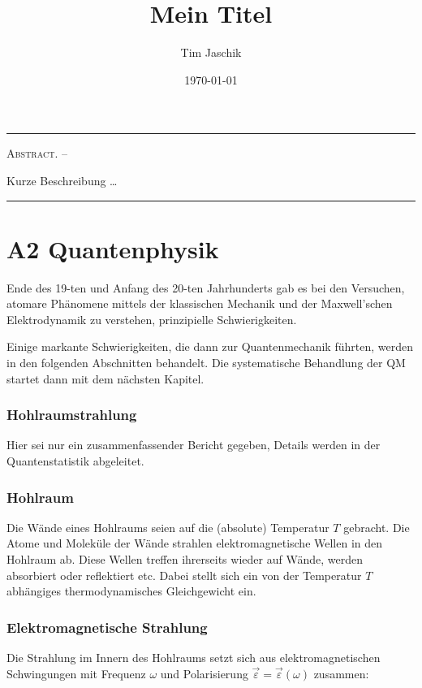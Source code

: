 \documentclass[10pt, letterpaper]{article}
\title{Mein Titel}
\author{Tim Jaschik}
\date{\today}
\renewenvironment{abstract}
  {
    \begin{adjustwidth}{1.5cm}{1.5cm}
    \small
    \textsc{Abstract. –}%
  }
  {
    \end{adjustwidth}
  }
\begin{document}
\maketitle
\rule{\textwidth}{0.5pt}
\begin{abstract}
Kurze Beschreibung …
\end{abstract}
\rule{\textwidth}{0.5pt}
\vspace{0.5cm}

\tableofcontents

\pagebreak



\section{A2 Quantenphysik}
Ende des 19-ten und Anfang des 20-ten Jahrhunderts gab es bei den Versuchen, atomare Phänomene mittels der klassischen Mechanik und der Maxwell'schen Elektrodynamik zu verstehen, prinzipielle Schwierigkeiten.

Einige markante Schwierigkeiten, die dann zur Quantenmechanik führten, werden in den folgenden Abschnitten behandelt. Die systematische Behandlung der QM startet dann mit dem nächsten Kapitel.

\subsubsection*{Hohlraumstrahlung}
Hier sei nur ein zusammenfassender Bericht gegeben, Details werden in der Quantenstatistik abgeleitet.

\subsubsection*{Hohlraum}
Die Wände eines Hohlraums seien auf die (absolute) Temperatur $T$ gebracht. Die Atome und Moleküle der Wände strahlen elektromagnetische Wellen in den Hohlraum ab. Diese Wellen treffen ihrerseits wieder auf Wände, werden absorbiert oder reflektiert etc. Dabei stellt sich ein von der Temperatur $T$ abhängiges thermodynamisches Gleichgewicht ein.

\subsubsection*{Elektromagnetische Strahlung}
Die Strahlung im Innern des Hohlraums setzt sich aus elektromagnetischen Schwingungen mit Frequenz $\omega$ und Polarisierung $\vec{\varepsilon}=\vec{\varepsilon}(\omega)$ zusammen:
\end{document}
